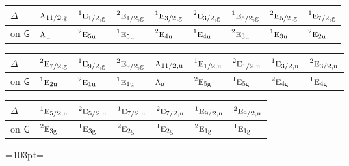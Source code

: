 \documentclass[10pt,a4paper]{article}
\newcommand{\needspace}[1]{\par\penalty-100\begingroup\dimen0=#1\relax\dimen2=\pagegoal
  \advance\dimen2-\pagetotal\ifdim\dimen0>\dimen2\relax\ifdim\dimen2>0pt\vfil\break\fi\fi
  \endgroup}
\numberwithin{equation}{section}
\newcommand{\grp}[1]{\mathsf{#1}}
\newcommand{\irr}[1]{\text{\normalfont\scshape #1}}
\newcommand{\conjpair}[1]{{}^{#1}}
\newcommand{\ptag}[1]{\mathrm{#1}}
\begin{document}
\begin{center}\begin{tabular}{@{}lllllllll@{}}\toprule
$\Delta$ & $\irr{a}_{11/2,\ptag{g}}$ & $\conjpair{1}\irr{e}_{1/2,\ptag{g}}$ & $\conjpair{2}\irr{e}_{1/2,\ptag{g}}$ & $\conjpair{1}\irr{e}_{3/2,\ptag{g}}$ & $\conjpair{2}\irr{e}_{3/2,\ptag{g}}$ & $\conjpair{1}\irr{e}_{5/2,\ptag{g}}$ & $\conjpair{2}\irr{e}_{5/2,\ptag{g}}$ & $\conjpair{1}\irr{e}_{7/2,\ptag{g}}$\\\midrule
on $\grp{G}$ & $\irr{a}_{\ptag{u}}$ & $\conjpair{2}\irr{e}_{5\ptag{u}}$ & $\conjpair{1}\irr{e}_{5\ptag{u}}$ & $\conjpair{2}\irr{e}_{4\ptag{u}}$ & $\conjpair{1}\irr{e}_{4\ptag{u}}$ & $\conjpair{2}\irr{e}_{3\ptag{u}}$ & $\conjpair{1}\irr{e}_{3\ptag{u}}$ & $\conjpair{2}\irr{e}_{2\ptag{u}}$\\
\bottomrule\end{tabular}\end{center}
\begin{center}\begin{tabular}{@{}lllllllll@{}}\toprule
$\Delta$ & $\conjpair{2}\irr{e}_{7/2,\ptag{g}}$ & $\conjpair{1}\irr{e}_{9/2,\ptag{g}}$ & $\conjpair{2}\irr{e}_{9/2,\ptag{g}}$ & $\irr{a}_{11/2,\ptag{u}}$ & $\conjpair{1}\irr{e}_{1/2,\ptag{u}}$ & $\conjpair{2}\irr{e}_{1/2,\ptag{u}}$ & $\conjpair{1}\irr{e}_{3/2,\ptag{u}}$ & $\conjpair{2}\irr{e}_{3/2,\ptag{u}}$\\\midrule
on $\grp{G}$ & $\conjpair{1}\irr{e}_{2\ptag{u}}$ & $\conjpair{2}\irr{e}_{1\ptag{u}}$ & $\conjpair{1}\irr{e}_{1\ptag{u}}$ & $\irr{a}_{\ptag{g}}$ & $\conjpair{2}\irr{e}_{5\ptag{g}}$ & $\conjpair{1}\irr{e}_{5\ptag{g}}$ & $\conjpair{2}\irr{e}_{4\ptag{g}}$ & $\conjpair{1}\irr{e}_{4\ptag{g}}$\\
\bottomrule\end{tabular}\end{center}
\begin{center}\begin{tabular}{@{}lllllll@{}}\toprule
$\Delta$ & $\conjpair{1}\irr{e}_{5/2,\ptag{u}}$ & $\conjpair{2}\irr{e}_{5/2,\ptag{u}}$ & $\conjpair{1}\irr{e}_{7/2,\ptag{u}}$ & $\conjpair{2}\irr{e}_{7/2,\ptag{u}}$ & $\conjpair{1}\irr{e}_{9/2,\ptag{u}}$ & $\conjpair{2}\irr{e}_{9/2,\ptag{u}}$\\\midrule
on $\grp{G}$ & $\conjpair{2}\irr{e}_{3\ptag{g}}$ & $\conjpair{1}\irr{e}_{3\ptag{g}}$ & $\conjpair{2}\irr{e}_{2\ptag{g}}$ & $\conjpair{1}\irr{e}_{2\ptag{g}}$ & $\conjpair{2}\irr{e}_{1\ptag{g}}$ & $\conjpair{1}\irr{e}_{1\ptag{g}}$\\
\bottomrule\end{tabular}\end{center}
\needspace{103pt}
\end{document}
